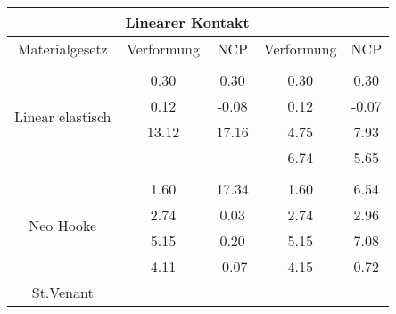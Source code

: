 \begin{table} 
\centering 
\begin{tabular}{c|cc|cc|} 
\cline{2-5} 
 & \multicolumn{2}{|c|}{Linearer Kontakt} &  \\ 
\hline 
\multicolumn{1}{|c|}{Materialgesetz} & \multicolumn{1}{c|}{Verformung} & \multicolumn{1}{c|}{NCP} & \multicolumn{1}{c|}{Verformung} & \multicolumn{1}{c|}{NCP} \\ 
\hline 
\multicolumn{1}{|c|}{\multirow{5}{*}{Linear elastisch}} &\multicolumn{1}{|c|}{} & \multicolumn{1}{|c|}{} & \multicolumn{1}{|c|}{} & \multicolumn{1}{|c|}{} \\ 
\multicolumn{1}{|c|}{} & \multicolumn{1}{|c|}{      0.30} & \multicolumn{1}{|c|}{      0.30} & \multicolumn{1}{|c|}{      0.30} & \multicolumn{1}{|c|}{      0.30} \\ 
\multicolumn{1}{|c|}{} & \multicolumn{1}{|c|}{      0.12} & \multicolumn{1}{|c|}{     -0.08} & \multicolumn{1}{|c|}{      0.12} & \multicolumn{1}{|c|}{     -0.07} \\ 
\multicolumn{1}{|c|}{} & \multicolumn{1}{|c|}{     13.12} & \multicolumn{1}{|c|}{     17.16} & \multicolumn{1}{|c|}{      4.75} & \multicolumn{1}{|c|}{      7.93} \\ 
\multicolumn{1}{|c|}{} & \multicolumn{1}{|c|}{} & \multicolumn{1}{|c|}{} & \multicolumn{1}{|c|}{      6.74} & \multicolumn{1}{|c|}{      5.65} \\ 
\hline 
\multicolumn{1}{|c|}{\multirow{5}{*}{Neo Hooke}} &\multicolumn{1}{|c|}{} & \multicolumn{1}{|c|}{} & \multicolumn{1}{|c|}{} & \multicolumn{1}{|c|}{} \\ 
\multicolumn{1}{|c|}{} & \multicolumn{1}{|c|}{      1.60} & \multicolumn{1}{|c|}{     17.34} & \multicolumn{1}{|c|}{      1.60} & \multicolumn{1}{|c|}{      6.54} \\ 
\multicolumn{1}{|c|}{} & \multicolumn{1}{|c|}{      2.74} & \multicolumn{1}{|c|}{      0.03} & \multicolumn{1}{|c|}{      2.74} & \multicolumn{1}{|c|}{      2.96} \\ 
\multicolumn{1}{|c|}{} & \multicolumn{1}{|c|}{      5.15} & \multicolumn{1}{|c|}{      0.20} & \multicolumn{1}{|c|}{      5.15} & \multicolumn{1}{|c|}{      7.08} \\ 
\multicolumn{1}{|c|}{} & \multicolumn{1}{|c|}{      4.11} & \multicolumn{1}{|c|}{     -0.07} & \multicolumn{1}{|c|}{      4.15} & \multicolumn{1}{|c|}{      0.72} \\ 
\hline 
\multicolumn{1}{|c|}{\multirow{5}{*}{St.Venant}} &\multicolumn{1}{|c|}{} & \multicolumn{1}{|c|}{} & \multicolumn{1}{|c|}{} & \multicolumn{1}{|c|}{} \\ 

\end{tabular}
\end{table}
